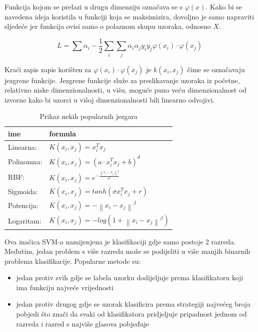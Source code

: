 \documentclass[times, utf8, zavrsni, numeric]{fer}
\begin{document}
\bigbreak

Funkcija kojom se prelazi u drugu dimenziju označava se s \(\varphi(x)\). Kako bi se navedena ideja
koristila u funkciji koja se maksimizira, dovoljno je samo napraviti sljedeće
jer funkcija ovisi samo o polaznom skupu uzoraka, odnosno \(X\).

\[
L = \sum \alpha_i - \frac{1}{2} \sum_i \sum_j \alpha_i \alpha_j y_i y_j \varphi(x_i) \cdot \varphi(x_j)
\]

Kraći zapis zapis korišten za \(\varphi(x_i) \cdot \varphi(x_j)\) je \(k(x_i, x_j)\) čime se označavaju 
jezgrene funkcije. Jezgrene funkcije služe za preslikavanje uzoraka iz početne, relativno niske 
dimenzionalnosti, u višu, moguće puno veću dimenzionalnost od izvorne kako bi uzorci u višoj 
dimenzionalnosti bili linearno odvojivi.

\begin{table}[htbp]
\centering
\caption{Prikaz nekih popularnih jezgara}
\begin{tabular}{ll}
\hline
ime & formula \\ \hline
Linearna: & \(K\left( x_i, x_j\right) = x_i^Tx_j\) \\
Polinomna: & \(K\left( x_i, x_j\right) = \left( a \cdot x_i^Tx_j + b\right)^d\)  \\
RBF: & \(K\left( x_i, x_j\right) = e^{-\frac{\left\lVert x_i - x_j \right\rVert^2}{\sigma^2}}\) \\
Sigmoida: & \(K(x_i, x_j) = tanh\left( \sigma x_i^T x_j + r\right)\) \\
Potencija: & \(K\left( x_i, x_j\right) = -\left\lVert x_i - x_j\right\rVert^\beta\) \\
Logaritam: & \(K\left( x_i, x_j\right) = -log\left( 1 + \left\lVert x_i - x_j\right\rVert^\beta\right)\) 
\end{tabular}
\end{table}

\newpage

Ova inačica SVM-a namijenjena je klasifikaciji gdje samo postoje 2 razreda. Međutim, 
jedan problem s više razreda može se podijeliti u više manjih binarnih problema klasifikacije. 
Popularne metode su: 

\begin{itemize}
	\item jedan protiv svih gdje se labela uzorku dodijeljuje prema klasifikatoru koji 
	ima funkciju najveće vrijednosti 
	\item jedan protiv drugog gdje se uzorak klasificira prema strategiji najvećeg 
	broja pobjedi što znači da svaki od klasifikatora pridjeljuje pripadnost jednom od razreda i razred s najviše glasova pobjeđuje
\end{itemize}
\end{document}

